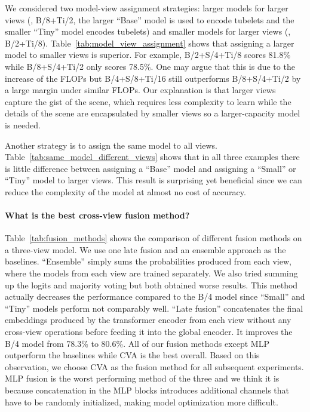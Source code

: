 We considered two model-view assignment strategies: larger models for larger views (\eg, B/8+Ti/2, the larger ``Base'' model is used to encode  tubelets and the smaller ``Tiny'' model encodes  tubelets) and smaller models for larger views (\eg, B/2+Ti/8).
Table~\ref{tab:model_view_assignment} shows that assigning a larger model to smaller views is superior. For example, B/2+S/4+Ti/8 scores 81.8\% while B/8+S/4+Ti/2 only scores 78.5\%. One may argue that this is due to the increase of the FLOPs but B/4+S/8+Ti/16 still outperforms B/8+S/4+Ti/2 by a large margin under similar FLOPs. Our explanation is that larger views capture the gist of the scene, which requires less complexity to learn while the details of the scene are encapsulated by smaller views so a larger-capacity model is needed.

Another strategy is to assign the same model to all views. Table~\ref{tab:same_model_different_views} shows that in all three examples there is little difference between assigning a ``Base'' model and assigning a ``Small'' or ``Tiny'' model to larger views.
This result is surprising yet beneficial since we can reduce the complexity of the model at almost no cost of accuracy.


\paragraph{What is the best cross-view fusion method?\eatpunct}
Table~\ref{tab:fusion_methods} shows the comparison of different fusion methods on a three-view model.
We use one late fusion and an ensemble approach as the baselines.
``Ensemble'' simply sums the probabilities produced from each view, where the models from each view are trained separately. We also tried summing up the logits and majority voting but both obtained worse results. This method actually decreases the performance compared to the B/4 model since ``Small'' and ``Tiny'' models perform not comparably well. ``Late fusion'' concatenates the final embeddings produced by the transformer encoder from each view without any cross-view operations before feeding it into the global encoder. It improves the B/4 model from 78.3\% to 80.6\%.
All of our fusion methods except MLP outperform the baselines while CVA is the best overall.
Based on this observation, we choose CVA as the fusion method for all subsequent experiments. MLP fusion is the worst performing method of the three and we think it is because concatenation in the MLP blocks introduces additional channels that have to be randomly initialized, making model optimization more difficult. 


